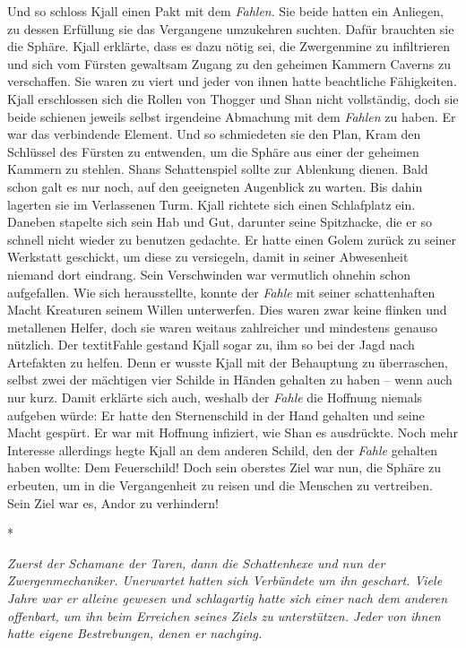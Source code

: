 \documentclass[10pt, a4paper, oneside]{book}
\begin{document}
\begin{multicols}{2}
Und so schloss Kjall einen Pakt mit dem \textit{Fahlen}. Sie beide hatten ein Anliegen, zu dessen Erfüllung sie das Vergangene umzukehren suchten. Dafür brauchten sie die Sphäre. Kjall erklärte, dass es dazu nötig sei, die Zwergenmine zu infiltrieren und sich vom Fürsten gewaltsam Zugang zu den geheimen Kammern Caverns zu verschaffen. Sie waren zu viert und jeder von ihnen hatte beachtliche Fähigkeiten. Kjall erschlossen sich die Rollen von Thogger und Shan nicht vollständig, doch sie beide schienen jeweils selbst irgendeine Abmachung mit dem \textit{Fahlen} zu haben. Er war das verbindende Element. Und so schmiedeten sie den Plan, Kram den Schlüssel des Fürsten zu entwenden, um die Sphäre aus einer der geheimen Kammern zu stehlen. Shans Schattenspiel sollte zur Ablenkung dienen. Bald schon galt es nur noch, auf den geeigneten Augenblick zu warten. Bis dahin lagerten sie im Verlassenen Turm. Kjall richtete sich einen Schlafplatz ein. Daneben stapelte sich sein Hab und Gut, darunter seine Spitzhacke, die er so schnell nicht wieder zu benutzen gedachte. Er hatte einen Golem zurück zu seiner Werkstatt geschickt, um diese zu versiegeln, damit in seiner Abwesenheit niemand dort eindrang. Sein Verschwinden war vermutlich ohnehin schon aufgefallen. Wie sich herausstellte, konnte der \textit{Fahle} mit seiner schattenhaften Macht Kreaturen seinem Willen unterwerfen. Dies waren zwar keine flinken und metallenen Helfer, doch sie waren weitaus zahlreicher und mindestens genauso nützlich. Der textit{Fahle} gestand Kjall sogar zu, ihm so bei der Jagd nach Artefakten zu helfen. Denn er wusste Kjall mit der Behauptung zu überraschen, selbst zwei der mächtigen vier Schilde in Händen gehalten zu haben – wenn auch nur kurz. Damit erklärte sich auch, weshalb der \textit{Fahle} die Hoffnung niemals aufgeben würde: Er hatte den Sternenschild in der Hand gehalten und seine Macht gespürt. Er war mit Hoffnung infiziert, wie Shan es ausdrückte. Noch mehr Interesse allerdings hegte Kjall an dem anderen Schild, den der \textit{Fahle} gehalten haben wollte: Dem Feuerschild! Doch sein oberstes Ziel war nun, die Sphäre zu erbeuten, um in die Vergangenheit zu reisen und die Menschen zu vertreiben. Sein Ziel war es, Andor zu verhindern!

\begin{center}
    *
\end{center}

\textit{Zuerst der Schamane der Taren, dann die Schattenhexe und nun der Zwergenmechaniker. Unerwartet hatten sich Verbündete um ihn geschart. Viele Jahre war er alleine gewesen und schlagartig hatte sich einer nach dem anderen offenbart, um ihn beim Erreichen seines Ziels zu unterstützen. Jeder von ihnen hatte eigene Bestrebungen, denen er nachging.}\bigskip


\end{multicols}
\end{document}

